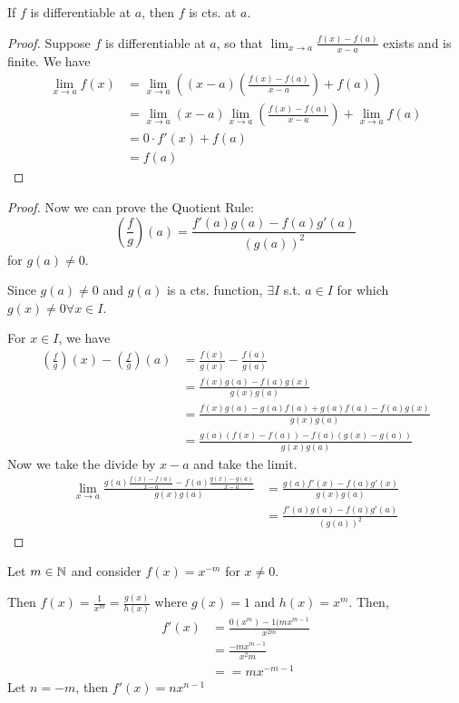 \documentclass{article}
\begin{document}
\begin{cthm}[Theorem 28.2]
    If $f$ is differentiable at $a$, then $f$ is cts. at $a$.
\end{cthm}
\begin{proof}
    Suppose $f$ is differentiable at $a$, so that $\lim_{x\to a}\frac{f(x) - f(a)}{x-a}$ exists and is finite.
    We have \begin{align*}
        \lim_{x\to a}f(x) &= \lim_{x\to a} \left( (x-a)\left(\frac{f(x) - f(a)}{x-a}\right) + f(a)\right) \tag{This is equal to $f(x)$}\\
        &= \lim_{x\to a} (x-a) \lim_{x\to a} \left( \frac{f(x) - f(a)}{x-a}\right) + \lim_{x\to a} f(a)\\
        &= 0 \cdot f'(x) + f(a)\\
        &= f(a)
    \end{align*}
\end{proof}
\begin{proof}
    Now we can prove the Quotient Rule:
    \[
        \left(\frac{f}{g}\right)(a) = \frac{f'(a)g(a) - f(a)g'(a)}{(g(a))^2}
    \]
    for $g(a) \neq 0$.

    Since $g(a) \neq 0$ and $g(a)$ is a cts. function, $\exists I$ s.t. $a \in I$ for which $g(x) \neq 0 \forall x \in I$.

    For $x \in I$, we have \begin{align*}
        \left(\frac{f}{g}\right)(x) - \left(\frac{f}{g}\right)(a) &= \frac{f(x)}{g(x)} - \frac{f(a)}{g(a)}\\
        &= \frac{f(x)g(a) - f(a)g(x)}{g(x)g(a)}\\
        &= \frac{f(x)g(a) - g(a)f(a) + g(a)f(a) - f(a)g(x)}{g(x)g(a)}\\
        &= \frac{g(a)(f(x) - f(a)) - f(a)(g(x) - g(a))}{g(x)g(a)}
    \end{align*}
    Now we take the divide by $x-a$ and take the limit.
    \begin{align*}
        \lim_{x\to a} \frac{g(a)\frac{f(x) - f(a)}{x-a} - f(a)\frac{g(x) - g(a)}{x-a}}{g(x)g(a)} &= \frac{g(a)f'(x)- f(a)g'(x)}{g(x)g(a)} \tag{distribute the limits}\\
        &= \frac{f'(a)g(a) - f(a)g'(a)}{(g(a))^2} \tag{$g$ is cts.}
    \end{align*}
\end{proof}
\begin{cthm}
    Let $m \in \mathbb{N}$ and consider $f(x) = x^{-m}$ for $x \neq 0$.

    Then $f(x) = \frac{1}{x^m} = \frac{g(x)}{h(x)}$ where $g(x) = 1$ and $h(x) = x^m$.
    Then, \begin{align*}
        f'(x) &= \frac{0(x^m) - 1(mx^{m-1}}{x^{2m}}\\
        &= \frac{-mx^{m-1}}{x^2m}\\
        &= =mx^{-m-1}
    \end{align*}
    Let $n = -m$, then $f'(x) = nx^{n-1}$
\end{cthm}
\end{document}
